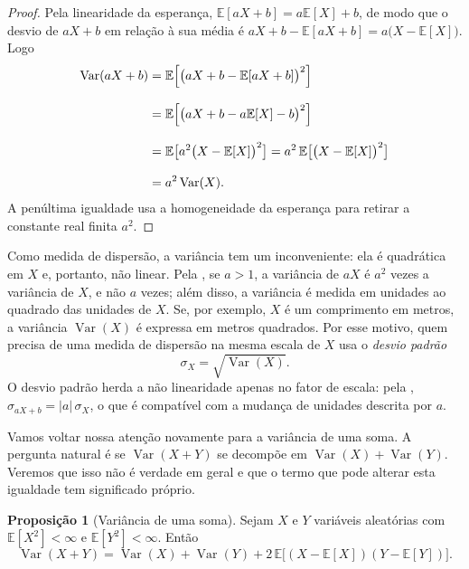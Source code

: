 \documentclass[12pt,portuguese]{article}
\theoremstyle{definition}
\newtheorem{proposition}[proposition]{Proposição}
\theoremstyle{plainexercise}
\theoremstyle{starredexercise}
\theoremstyle{definition}
\begin{document}
\begin{proof}
Pela linearidade da esperança, $\mathbb{E}[aX+b]=a\mathbb{E}[X]+b$, de modo que
o desvio de $aX+b$ em relação à sua média é
$aX+b-\mathbb{E}[aX+b]=a\bigl(X-\mathbb{E}[X]\bigr)$. Logo
\begin{align*}
\operatorname{Var}(aX+b)
&= \mathbb{E}\Bigl[\bigl(aX+b-\mathbb{E}[aX+b]\bigr)^2\Bigr]
\\[0.3cm]
&= \mathbb{E}\Bigl[\bigl(aX+b-a\mathbb{E}[X]-b\bigr)^2\Bigr]
\\[0.3cm]
&= \mathbb{E}\bigl[a^2\bigl(X-\mathbb{E}[X]\bigr)^2\bigr]
= a^2\,\mathbb{E}\bigl[\bigl(X-\mathbb{E}[X]\bigr)^2\bigr]
\\[0.3cm]
&= a^2\operatorname{Var}(X).
\end{align*}
A penúltima igualdade usa a homogeneidade da esperança para retirar a constante
real finita $a^2$.
\end{proof}

Como medida de dispersão, a variância tem um inconveniente: ela é quadrática em
$X$ e, portanto, não linear. Pela , se $a>1$, a
variância de $aX$ é $a^2$ vezes a variância de $X$, e não $a$ vezes; além disso,
a variância é medida em unidades ao quadrado das unidades de $X$. Se, por
exemplo, $X$ é um comprimento em metros, a variância $\operatorname{Var}(X)$ é expressa em
metros quadrados. Por esse motivo, quem precisa de uma medida de dispersão na
mesma escala de $X$ usa o \emph{desvio padrão}
\[
\sigma_X=\sqrt{\operatorname{Var}(X)}.
\]
O desvio padrão herda a não linearidade apenas no fator de escala: pela
, $\sigma_{aX+b}=|a|\,\sigma_X$, o que é compatível
com a mudança de unidades descrita por $a$.

\medskip

Vamos voltar nossa atenção novamente para a variância de uma soma. A pergunta natural é se
$\operatorname{Var}(X+Y)$ se decompõe em $\operatorname{Var}(X)+
\operatorname{Var}(Y)$. Veremos que isso não é verdade em geral e que o termo
que pode alterar esta igualdade tem significado próprio.

\begin{proposition}[Variância de uma soma]\label{prop:variancia-soma}
Sejam $X$ e $Y$ variáveis aleatórias com $\mathbb{E}[X^2]<\infty$ e
$\mathbb{E}[Y^2]<\infty$. Então
\begin{equation}\label{eq:variancia-soma}
\operatorname{Var}(X+Y)
=\operatorname{Var}(X)+\operatorname{Var}(Y)
+2\,\mathbb{E}\bigl[(X-\mathbb{E}[X])(Y-\mathbb{E}[Y])\bigr].
\end{equation}
\end{proposition}
\end{document}
